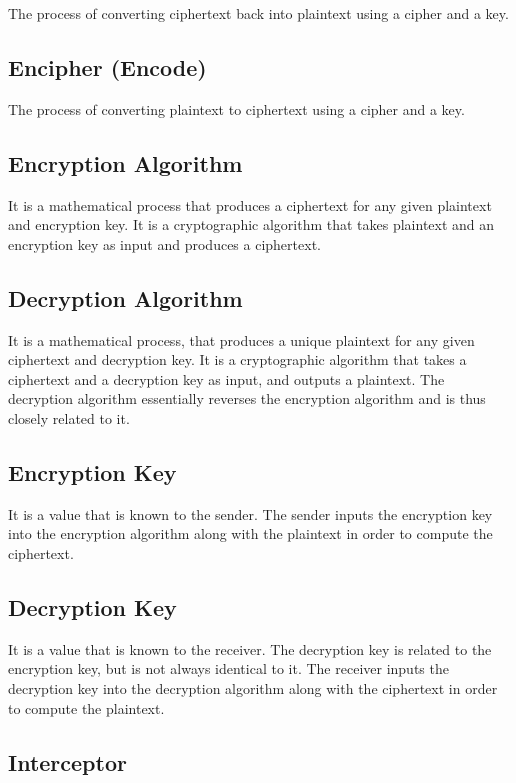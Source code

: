 \documentclass[british]{article}
\begin{document}
The process of converting ciphertext back into plaintext using a cipher
and a key.

\subsection{Encipher (Encode)}

The process of converting plaintext to ciphertext using a cipher and
a key.

\subsection{Encryption Algorithm}

It is a mathematical process that produces a ciphertext for any given
plaintext and encryption key. It is a cryptographic algorithm that
takes plaintext and an encryption key as input and produces a ciphertext.

\subsection{Decryption Algorithm}

It is a mathematical process, that produces a unique plaintext for
any given ciphertext and decryption key. It is a cryptographic algorithm
that takes a ciphertext and a decryption key as input, and outputs
a plaintext. The decryption algorithm essentially reverses the encryption
algorithm and is thus closely related to it.

\subsection{Encryption Key}

It is a value that is known to the sender. The sender inputs the encryption
key into the encryption algorithm along with the plaintext in order
to compute the ciphertext.

\subsection{Decryption Key}

It is a value that is known to the receiver. The decryption key is
related to the encryption key, but is not always identical to it.
The receiver inputs the decryption key into the decryption algorithm
along with the ciphertext in order to compute the plaintext.

\subsection{Interceptor}
\end{document}
